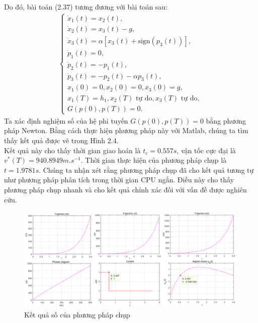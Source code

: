 \documentclass[12pt,a4paper]{report}
\begin{document}
Do đó, bài toán (2.37) tương đương với bài toán sau:
\begin{eqnarray}
	\begin{cases}
	\dot{x}_1(t) = x_2(t), \\ \dot{x}_2(t) = x_3(t)-g, \\ \dot{x}_3(t) = \alpha[x_3(t)+\text{sign}(p_3(t))], \\ \dot{p}_1(t) = 0, \\\dot{p}_2(t) = -p_1(t), \\ \dot{p}_3(t) = -p_2(t)-\alpha p_3(t), \\x_1(0)=0,x_2(0)=0,x_3(0)=g, \\ x_1(T)=h_1, x_2(T) \text{  tự do}, x_3(T) \text{ tự do}, \\ G(p(0), p(T)) = 0.
\end{cases}
\end{eqnarray}
Ta xác định nghiệm số của hệ phi tuyến $G(p(0), p(T)) = 0$ bằng phương pháp Newton. Bằng cách thực hiện phương pháp này với Matlab, chúng ta tìm thấy kết quả được vẽ trong Hình 2.4. \\ Kết quả này cho thấy thời gian giao hoán là $t_c = 0.557s$, vận tốc cực đại là $v^*(T) = 940.8949 m.s^{-1}$. Thời gian thực hiện của phương pháp chụp là $t = 1.9781s$. Chúng ta nhận xét rằng phương pháp chụp đã cho kết quả tương tự như phương pháp phân tích trong thời gian CPU ngắn. Điều này cho thấy phương pháp chụp nhanh và cho kết quả chính xác đối với vấn đề được nghiên cứu.
\begin{figure}[h]
	\centering
	\includegraphics[scale=.45]{./image/hinh4.png}
	\caption{Kết quả số của phương pháp chụp}
\end{figure}
\end{document}
